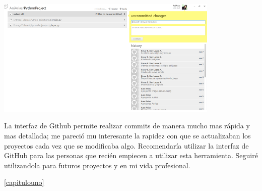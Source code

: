 \documentclass[12pt]{report}
\begin{document}
	\begin{center}
		\begingroup
			\includegraphics[width=0.8\textwidth]{imagenes_usuario/git3.png}
\newline
\newline
		\endgroup
	\end{center}

La interfaz de Github permite realizar commits de manera mucho mas rápida y mas detallada; me pareció mu interesante la rapidez con que se actualizaban los proyectos cada vez que se modificaba algo.
Recomendaría utilizar la interfaz de GitHub para las personas que recién empiecen a utilizar esta herramienta.
\newline
\newline
Seguiré utilizandola para futuros proyectos y en mi vida profesional.

 \ref{capitulouno}
\end{document}
